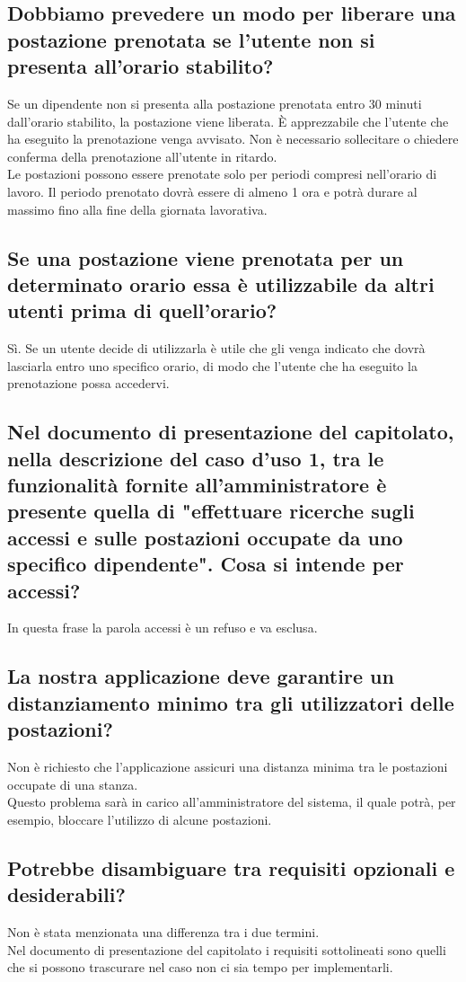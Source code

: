 \subsection*{Dobbiamo prevedere un modo per liberare una postazione prenotata se l'utente non si presenta all'orario stabilito?}
Se un dipendente non si presenta alla postazione prenotata entro 30 minuti dall'orario stabilito, la postazione viene liberata. È apprezzabile che l'utente che ha eseguito la prenotazione venga avvisato. Non è necessario sollecitare o chiedere conferma della prenotazione all'utente in ritardo.\\
Le postazioni possono essere prenotate solo per periodi compresi nell'orario di lavoro.
Il periodo prenotato dovrà essere di almeno 1 ora e potrà durare al massimo fino alla fine della giornata lavorativa.\\


\subsection*{Se una postazione viene prenotata per un determinato orario essa è utilizzabile da altri utenti prima di quell'orario?}
Sì. Se un utente decide di utilizzarla è utile che gli venga indicato che dovrà lasciarla entro uno specifico orario, di modo che l'utente che ha eseguito la prenotazione possa accedervi.

\subsection*{Nel documento di presentazione del capitolato, nella descrizione del caso d'uso 1, tra le funzionalità fornite all'amministratore è presente quella di "effettuare ricerche sugli accessi e sulle postazioni occupate da uno specifico dipendente". Cosa si intende per accessi?}
In questa frase la parola accessi è un refuso e va esclusa.

\subsection*{La nostra applicazione deve garantire un distanziamento minimo tra gli utilizzatori delle postazioni?}			
Non è richiesto che l'applicazione assicuri una distanza minima tra le postazioni occupate di una stanza.\\
Questo problema sarà in carico all'amministratore del sistema, il quale potrà, per esempio, bloccare l'utilizzo di alcune postazioni.

\subsection*{Potrebbe disambiguare tra requisiti opzionali e desiderabili?}
Non è stata menzionata una differenza tra i due termini.\\
Nel documento di presentazione del capitolato i requisiti sottolineati sono quelli che si possono trascurare nel caso non ci sia tempo per implementarli.

